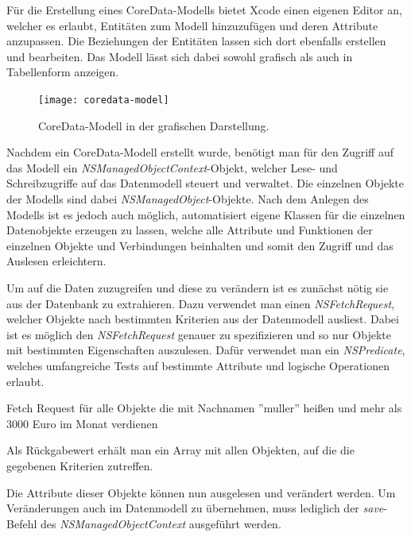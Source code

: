 Für die Erstellung eines CoreData-Modells bietet Xcode einen eigenen Editor an, welcher es erlaubt, Entitäten zum Modell hinzuzufügen und deren Attribute anzupassen. Die Beziehungen der Entitäten lassen sich dort ebenfalls erstellen und bearbeiten. Das Modell lässt sich dabei sowohl grafisch als auch in Tabellenform anzeigen.

\begin{figure}[htb!]
		\centering
	\texttt{[image: coredata-model]}
	\caption{CoreData-Modell in der grafischen Darstellung.}
	\label{coredata-model}
\end{figure}


Nachdem ein CoreData-Modell erstellt wurde, benötigt man für den Zugriff auf das Modell ein \emph{NSManagedObjectContext}-Objekt, welcher Lese- und Schreibzugriffe auf das Datenmodell steuert und verwaltet.
Die einzelnen Objekte der Modells sind dabei \emph{NSManagedObject}-Objekte. Nach dem Anlegen des Modells ist es jedoch auch möglich, automatisiert eigene Klassen für die einzelnen Datenobjekte erzeugen zu lassen, welche alle Attribute und Funktionen der einzelnen Objekte und Verbindungen beinhalten und somit den Zugriff und das Auslesen erleichtern.

Um auf die Daten zuzugreifen und diese zu verändern ist es zunächst nötig sie aus der Datenbank zu extrahieren. Dazu verwendet man einen \emph{NSFetchRequest}, welcher Objekte nach bestimmten Kriterien aus der Datenmodell ausliest.
Dabei ist es möglich den \emph{NSFetchRequest} genauer zu spezifizieren und so nur Objekte mit bestimmten Eigenschaften auszulesen.
Dafür verwendet man ein \emph{NSPredicate}, welches umfangreiche Tests auf bestimmte Attribute und logische Operationen erlaubt.

\begin{listing}[htb! breaklines=true]
    \caption{Fetch Request für alle Objekte die mit Nachnamen ''muller'' heißen und mehr als 3000 Euro im Monat verdienen}
	\label{lst:NSFetchRequest_objc}
\end{listing}

Als Rückgabewert erhält man ein Array mit allen Objekten, auf die die gegebenen Kriterien zutreffen.

Die Attribute dieser Objekte können nun ausgelesen und verändert werden. Um Veränderungen auch im Datenmodell zu übernehmen, muss lediglich der \emph{save}-Befehl des \emph{NSManagedObjectContext} ausgeführt werden.

